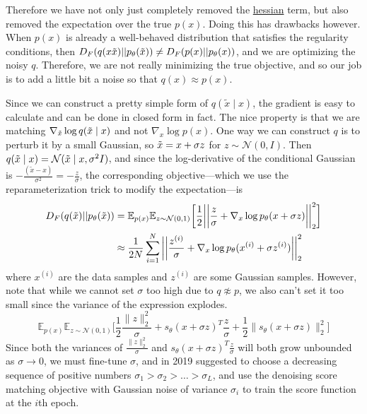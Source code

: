 \documentclass{article}
\begin{document}
    Therefore we have not only just completely removed the \hyperref[mv-def:hessian]{hessian} term, but also removed the expectation over the true $p(x)$. Doing this has drawbacks however. When $p(x)$ is already a well-behaved distribution that satisfies the regularity conditions, then $D_F (q(x\Tilde{x}) || p_\theta (\Tilde{x})) \neq D_F(p(x) || p_\theta (x))$, and we are optimizing the noisy $q$. Therefore, we are not really minimizing the true objective, and so our job is to add a little bit a noise so that $q(x) \approx p(x)$. 

    Since we can construct a pretty simple form of $q(\tilde{x} \mid x)$, the gradient is easy to calculate and can be done in closed form in fact. The nice property is that we are matching $\nabla_{\Tilde{x}} \log q(\Tilde{x} \mid x)$ and not $\nabla_x \log p(x)$. One way we can construct $q$ is to perturb it by a small Gaussian, so $\Tilde{x} = x + \sigma z$ for $z \sim \mathcal{N}(0, I)$. Then $q(\Tilde{x} \mid x) = \mathcal{N}(\Tilde{x} \mid x, \sigma^2 I)$, and since the log-derivative of the conditional Gaussian is $-\frac{(\tilde{x} - x)}{\sigma^2} = -\frac{z}{\sigma}$, the corresponding objective---which we use the reparameterization trick to modify the expectation---is 
    \begin{align}
      D_F (q(\Tilde{x}) || p_\theta (\Tilde{x})) & = \mathbb{E}_{p(x)} \mathbb{E}_{z \sim \mathcal{N}(0, 1)} \bigg[ \frac{1}{2} \bigg| \bigg| \frac{z}{\sigma} + \nabla_x \log p_\theta (x + \sigma z) \bigg| \bigg|_2^2 \bigg] \\
                                                 & \approx \frac{1}{2N} \sum_{i=1}^N \bigg|\bigg| \frac{z^{(i)}}{\sigma} + \nabla_x \log p_\theta (x^{(i)} + \sigma z^{(i)}) \bigg|\bigg|_2^2
    \end{align}
    where $x^{(i)}$ are the data samples and $z^{(i)}$ are some Gaussian samples. However, note that while we cannot set $\sigma$ too high due to $q \not\approx p$, we also can't set it too small since the variance of the expression explodes. 
    \begin{equation}
      \mathbb{E}_{p(x)} \mathbb{E}_{z \sim \mathcal{N}(0, 1)} \bigg[ \frac{1}{2}\frac{\|z\|_2^2}{\sigma} + s_\theta(x + \sigma z)^T \frac{z}{\sigma} + \frac{1}{2}\big\|s_\theta(x + \sigma z)\big\|_2^2 \bigg]
    \end{equation}
    Since both the variances of $\frac{\|z\|_2^2}{\sigma}$ and $s_\theta(x + \sigma z)^T \frac{z}{\sigma}$ will both grow unbounded as $\sigma \rightarrow 0$, we must fine-tune $\sigma$, and \cite{score} in 2019 suggested to choose a decreasing sequence of positive numbers $\sigma_1 > \sigma_2 > \ldots > \sigma_L$, and use the denoising score matching objective with Gaussian noise of variance $\sigma_i$ to train the score function at the $i$th epoch. 
\end{document}
